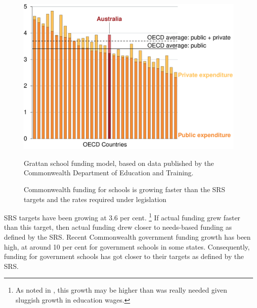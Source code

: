 \documentclass{grattan}
\begin{document}
\begin{figure}
\caption{Commonwealth funding for schools is growing faster than the SRS targets and the rates required under legislation}\label{fig:recent-commonwealth-funding-growth}


\includegraphics[page=22]{atlas/Charts.pdf}

%
{Grattan school funding model, based on data published by the Commonwealth Department of Education and Training.}
\end{figure}

SRS targets have been growing at 3.6 per cent.%
\footnote{As noted in , this growth may be higher than was really needed given sluggish growth in education wages.}
If actual funding grew faster than this target, then actual funding drew closer to needs-based funding as defined by the SRS\@.
Recent Commonwealth government funding growth has been high, at around 10 per cent for government schools in some states.
Consequently, funding for government schools has got closer to their targets as defined by the SRS.
\end{document}
